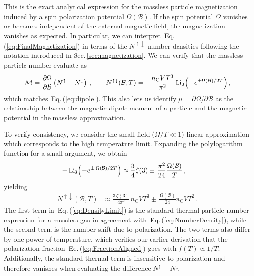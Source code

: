 \documentclass[epjST]{svjour}
\newcommand{\req}[1]{Eq.\,(\ref{#1})}
\newcommand{\rsec}[1]{Sec.\,{\ref{#1}}}
\begin{document}
{This is the exact analytical expression for the massless particle magnetization induced by a spin polarization potential \(\Omega(\mathcal{B})\). If the spin potential \(\Omega\) vanishes or becomes independent of the external magnetic field, the magnetization vanishes as expected. In particular, we can interpret~\req{eq:FinalMagnetization} in terms of the \(N^{\uparrow\downarrow}\) number densities following the notation introduced in \rsec{sec:magnetization}. We can verify that the massless particle number evaluate as
\begin{equation}
 \label{eq:RecastingMagnetization}
 \mathcal{M} = \frac{\partial\Omega}{\partial\mathcal{B}}\left(N^{\uparrow}-N^{\downarrow}\right)\,,\qquad
 N^{\uparrow\downarrow}(\mathcal{B},T) = -\frac{n_{\mathrm{C}}VT^3}{\pi^2}\operatorname{Li}_3\Bigl(-e^{\pm\Omega(\mathcal{B})/2T}\Bigr)\,,
\end{equation}
which matches~\req{eq:dipole}. This also lets us identify \(\mu=\partial\Omega/\partial\mathcal{B}\) as the relationship between the magnetic dipole moment of a particle and the magnetic potential in the massless approximation.

To verify consistency, we consider the small-field (\(\Omega/T\ll 1\)) linear approximation which corresponds to the high temperature limit. Expanding the polylogarithm function for a small argument, we obtain
\begin{align}
 -\operatorname{Li}_3\Bigl(-e^{\pm\,\Omega(\mathcal{B})/2T}\Bigr) &\approx \frac{3}{4}\zeta(3) \pm\,\frac{\pi^2}{24}\frac{\Omega(\mathcal{B})}{T}\,,
\end{align}
yielding
\begin{align}
 \label{eq:DensityLimit}
 N^{\uparrow\downarrow}(\mathcal{B},T) &\approx \frac{3\,\zeta(3)}{4\pi^2}\,n_{\mathrm{C}}VT^3 \pm\,\frac{\Omega(\mathcal{B})}{24}n_{\mathrm{C}}VT^2\,.
\end{align}
The first term in~\req{eq:DensityLimit} is the standard thermal particle number expression for a massless gas in agreement with~\req{eq:NumberDensity}, while the second term is the number shift due to polarization. The two terms also differ by one power of temperature, which verifies our earlier derivation that the polarization fraction~\req{eq:FractionAligned} goes with \(f(T)\propto1/T\). Additionally, the standard thermal term is insensitive to polarization and therefore vanishes when evaluating the difference \(N^{\uparrow}-N^{\downarrow}\).

}
\end{document}
